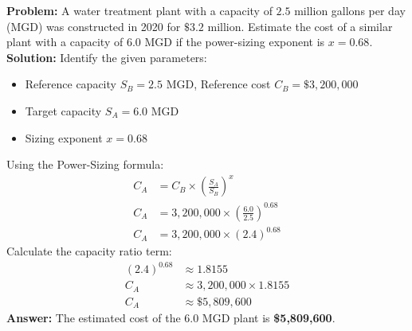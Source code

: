 \documentclass[12pt,a4paper]{article}
\begin{document}
\begin{tcolorbox}[examplebox, title={Example 2: Power-Sizing Model}]
\textbf{Problem:} A water treatment plant with a capacity of $2.5$ million gallons per day (MGD) was constructed in 2020 for $\$3.2$ million. Estimate the cost of a similar plant with a capacity of $6.0$ MGD if the power-sizing exponent is $x = 0.68$.\\[4pt]
\textbf{Solution:}
Identify the given parameters:
\begin{itemize}[leftmargin=*, itemsep=1pt]
  \item[] Reference capacity $S_B = 2.5$ MGD, Reference cost $C_B = \$3,200,000$
  \item[] Target capacity $S_A = 6.0$ MGD
  \item[] Sizing exponent $x = 0.68$
\end{itemize}
Using the Power-Sizing formula:
\begin{align*}
  C_A &= C_B \times \left( \frac{S_A}{S_B} \right)^x \\[4pt]
  C_A &= 3,200,000 \times \left( \frac{6.0}{2.5} \right)^{0.68} \\[4pt]
  C_A &= 3,200,000 \times (2.4)^{0.68}
\end{align*}
Calculate the capacity ratio term:
\begin{align*}
  (2.4)^{0.68} &\approx 1.8155 \\[4pt]
  C_A &\approx 3,200,000 \times 1.8155 \\[4pt]
  C_A &\approx \$5,809,600
\end{align*}
\textbf{Answer:} The estimated cost of the 6.0 MGD plant is \textbf{\$5,809,600}.
\end{tcolorbox}
\end{document}
